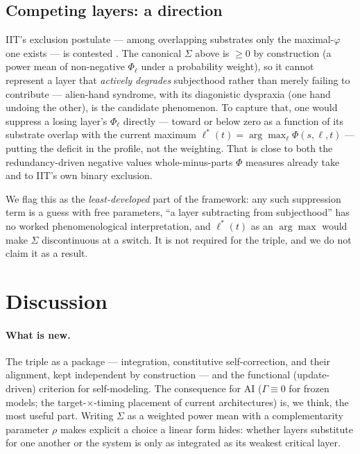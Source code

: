 \documentclass[11pt]{article}
\begin{document}
\subsection{Competing layers: a direction}\label{sec:exclusion}
IIT's exclusion postulate --- among overlapping substrates only the maximal-$\varphi$ one exists \cite{albantakis2023} --- is contested \cite{hanson2023}. The canonical $\Sigma$ above is $\ge0$ by construction (a power mean of non-negative $\Phi_\ell$ under a probability weight), so it cannot represent a layer that \emph{actively degrades} subjecthood rather than merely failing to contribute --- alien-hand syndrome, with its diagonistic dyspraxia (one hand undoing the other), is the candidate phenomenon. To capture that, one would suppress a losing layer's $\Phi_\ell$ directly --- toward or below zero as a function of its substrate overlap with the current maximum $\ell^*(t)=\arg\max_\ell\Phi(s,\ell,t)$ --- putting the deficit in the profile, not the weighting. That is close to both the redundancy-driven negative values whole-minus-parts $\Phi$ measures already take \cite{barrett2019,phiid2019} and to IIT's own binary exclusion.

We flag this as the \emph{least-developed} part of the framework: any such suppression term is a guess with free parameters, ``a layer subtracting from subjecthood'' has no worked phenomenological interpretation, and $\ell^*(t)$ as an $\arg\max$ would make $\Sigma$ discontinuous at a switch. It is not required for the triple, and we do not claim it as a result.

\section{Discussion}\label{sec:discussion}

\paragraph{What is new.} The triple as a package --- integration, constitutive self-correction, and their alignment, kept independent by construction --- and the functional (update-driven) criterion for self-modeling. The consequence for AI ($\Gamma\equiv0$ for frozen models; the target-$\times$-timing placement of current architectures) is, we think, the most useful part. Writing $\Sigma$ as a weighted power mean with a complementarity parameter $\rho$ makes explicit a choice a linear form hides: whether layers substitute for one another or the system is only as integrated as its weakest critical layer.
\end{document}
